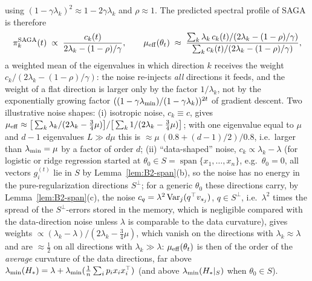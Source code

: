 using $(1-\gamma\lambda_k)^2\approx1-2\gamma\lambda_k$ and $\rho\approx1$. The predicted spectral profile of SAGA is
therefore
\begin{equation}\label{eq:B2-saga-profile}
\pi_k^{\mathrm{SAGA}}(t)\;\propto\;\frac{c_k(t)}{2\lambda_k-(1-\rho)/\gamma},\qquad
\mu_{\mathrm{eff}}(\theta_t)\;\approx\;\frac{\sum_k\lambda_k\,c_k(t)/(2\lambda_k-(1-\rho)/\gamma)}{\sum_kc_k(t)/(2\lambda_k-(1-\rho)/\gamma)} ,
\end{equation}
a weighted mean of the eigenvalues in which direction $k$ receives the weight $c_k/(2\lambda_k-(1-\rho)/\gamma)$:
the noise re-injects \emph{all} directions it feeds, and the weight of a flat direction is larger only by the
factor $1/\lambda_k$, not by the exponentially growing factor $((1-\gamma\lambda_{\min})/(1-\gamma\lambda_k))^{2t}$ of
gradient descent. Two illustrative noise shapes: (i) isotropic noise, $c_k\equiv c$, gives
$\mu_{\mathrm{eff}}\approx\big[\sum_k\lambda_k/(2\lambda_k-\frac34\mu)\big]/\big[\sum_k1/(2\lambda_k-\frac34\mu)\big]$; with one
eigenvalue equal to $\mu$ and $d-1$ eigenvalues $L\gg d\mu$ this is $\approx\mu\,(0.8+(d-1)/2)/0.8$, i.e.\ larger
than $\lambda_{\min}=\mu$ by a factor of order $d$; (ii) ``data-shaped'' noise, $c_k\propto\lambda_k-\lambda$ (for
logistic or ridge regression started at $\theta_0\in S=\operatorname{span}\{x_1,\dots,x_n\}$, e.g.\ $\theta_0=0$, all
vectors $g_i^{(t)}$ lie in $S$ by Lemma~\ref{lem:B2-span}(b), so the noise has no energy in the pure-regularization
directions $S^\perp$; for a generic $\theta_0$ these directions carry, by Lemma~\ref{lem:B2-span}(c), the noise
$c_q=\lambda^2\operatorname{Var}_j(q^\top v_{s_j})$, $q\in S^\perp$, i.e.\ $\lambda^2$ times the spread of the $S^\perp$-errors stored in
the memory, which is negligible compared with the data-direction noise unless $\lambda$ is comparable to the data
curvature), gives weights $\propto(\lambda_k-\lambda)/(2\lambda_k-\frac34\mu)$, which
vanish on the directions with $\lambda_k\approx\lambda$ and are $\approx\frac12$ on all directions with
$\lambda_k\gg\lambda$: $\mu_{\mathrm{eff}}(\theta_t)$ is then of the order of the \emph{average} curvature of the data
directions, far above $\lambda_{\min}(H_\ast)=\lambda+\lambda_{\min}(\frac1n\sum_ip_ix_ix_i^\top)$ (and above $\lambda_{\min}(H_\ast|_S)$ when
$\theta_0\in S$).

